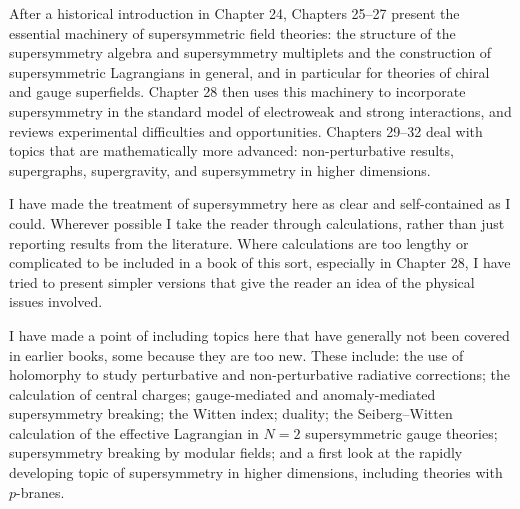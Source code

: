 After a historical introduction in Chapter 24, Chapters 25--27 present the
essential machinery of supersymmetric field theories: the structure of the
supersymmetry algebra and supersymmetry multiplets and the construction of
supersymmetric Lagrangians in general, and in particular for theories of chiral
and gauge superfields. Chapter 28 then uses this machinery to incorporate
supersymmetry in the standard model of electroweak and strong interactions, and
reviews experimental difficulties and opportunities. Chapters 29--32 deal with
topics that are mathematically more advanced: non-perturbative results,
supergraphs, supergravity, and supersymmetry in higher dimensions.

I have made the treatment of supersymmetry here as clear and self-contained as
I could. Wherever possible I take the reader through calculations, rather than
just reporting results from the literature. Where calculations are too lengthy
or complicated to be included in a book of this sort, especially in Chapter
28, I have tried to present simpler versions that give the reader an idea of
the physical issues involved.

I have made a point of including topics here that have generally not been
covered in earlier books, some because they are too new. These include: the use
of holomorphy to study perturbative and non-perturbative radiative corrections;
the calculation of central charges; gauge-mediated and anomaly-mediated
supersymmetry breaking; the Witten index; duality; the Seiberg--Witten
calculation of the effective Lagrangian in $N=2$ supersymmetric gauge theories;
supersymmetry breaking by modular fields; and a first look at the rapidly
developing topic of supersymmetry in higher dimensions, including theories
with $p$-branes.

